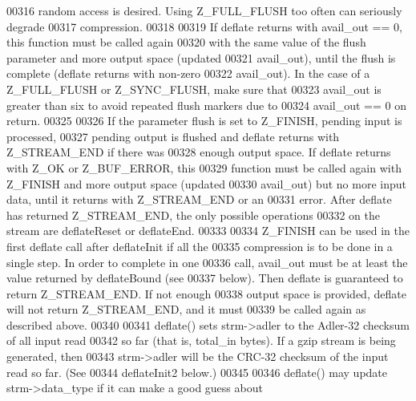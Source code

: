 \begin{DoxyCode}
00316 \textcolor{comment}{  random access is desired.  Using Z\_FULL\_FLUSH too often can seriously degrade}
00317 \textcolor{comment}{  compression.}
00318 \textcolor{comment}{}
00319 \textcolor{comment}{    If deflate returns with avail\_out == 0, this function must be called again}
00320 \textcolor{comment}{  with the same value of the flush parameter and more output space (updated}
00321 \textcolor{comment}{  avail\_out), until the flush is complete (deflate returns with non-zero}
00322 \textcolor{comment}{  avail\_out).  In the case of a Z\_FULL\_FLUSH or Z\_SYNC\_FLUSH, make sure that}
00323 \textcolor{comment}{  avail\_out is greater than six to avoid repeated flush markers due to}
00324 \textcolor{comment}{  avail\_out == 0 on return.}
00325 \textcolor{comment}{}
00326 \textcolor{comment}{    If the parameter flush is set to Z\_FINISH, pending input is processed,}
00327 \textcolor{comment}{  pending output is flushed and deflate returns with Z\_STREAM\_END if there was}
00328 \textcolor{comment}{  enough output space.  If deflate returns with Z\_OK or Z\_BUF\_ERROR, this}
00329 \textcolor{comment}{  function must be called again with Z\_FINISH and more output space (updated}
00330 \textcolor{comment}{  avail\_out) but no more input data, until it returns with Z\_STREAM\_END or an}
00331 \textcolor{comment}{  error.  After deflate has returned Z\_STREAM\_END, the only possible operations}
00332 \textcolor{comment}{  on the stream are deflateReset or deflateEnd.}
00333 \textcolor{comment}{}
00334 \textcolor{comment}{    Z\_FINISH can be used in the first deflate call after deflateInit if all the}
00335 \textcolor{comment}{  compression is to be done in a single step.  In order to complete in one}
00336 \textcolor{comment}{  call, avail\_out must be at least the value returned by deflateBound (see}
00337 \textcolor{comment}{  below).  Then deflate is guaranteed to return Z\_STREAM\_END.  If not enough}
00338 \textcolor{comment}{  output space is provided, deflate will not return Z\_STREAM\_END, and it must}
00339 \textcolor{comment}{  be called again as described above.}
00340 \textcolor{comment}{}
00341 \textcolor{comment}{    deflate() sets strm->adler to the Adler-32 checksum of all input read}
00342 \textcolor{comment}{  so far (that is, total\_in bytes).  If a gzip stream is being generated, then}
00343 \textcolor{comment}{  strm->adler will be the CRC-32 checksum of the input read so far.  (See}
00344 \textcolor{comment}{  deflateInit2 below.)}
00345 \textcolor{comment}{}
00346 \textcolor{comment}{    deflate() may update strm->data\_type if it can make a good guess about}

\end{DoxyCode}
